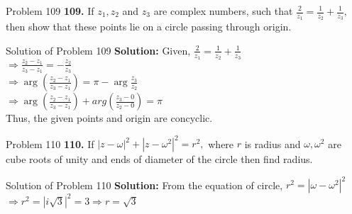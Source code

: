 \documentclass[aspectratio=169,8pt]{beamer}
\begin{document}
\begin{frame}{Problem 109}
  \textbf{109.} If $z_1, z_2$ and $z_3$ are complex numbers, such that $\frac{2}{z_1} = \frac{1}{z_2} + \frac{1}{z_3},$ then show
  that these points lie on a circle passing through origin.
\end{frame}
\begin{frame}{Solution of Problem 109}
  \textbf{Solution:} Given, $\frac{2}{z_1} = \frac{1}{z_2} + \frac{1}{z_3}$\\
  \vspace*{0.2cm}
  $\Rightarrow \frac{z_2 - z_1}{z_3 - z_1} = -\frac{z_2}{z_3}$\\
  \vspace*{0.2cm}
  $\Rightarrow \arg\left(\frac{z_2 - z_1}{z_3 - z_1}\right) = \pi - \arg\frac{z_3}{z_2}$\\
  \vspace*{0.2cm}
  $\Rightarrow \arg\left(\frac{z_2 - z_1}{z_3 - z_1}\right) + arg\left(\frac{z_3 - 0}{z_2 - 0}\right) = \pi$\\
  \vspace*{0.2cm}
  Thus, the given points and origin are concyclic.
\end{frame}
\begin{frame}{Problem 110}
  \textbf{110.} If $|z - \omega|^2 + |z - \omega^2|^2 = r^2,$ where $r$ is radius and $\omega, \omega^2$ are cube roots of unity
  and ends of diameter of the circle then find radius.
\end{frame}
\begin{frame}{Solution of Problem 110}
  \textbf{Solution:} From the equation of circle, $r^2 = |\omega - \omega^2|^2$\\
  \vspace*{0.2cm}
  $\Rightarrow r^2 = |i\sqrt{3}|^2 = 3 \Rightarrow r = \sqrt{3}$
\end{frame}
\end{document}
